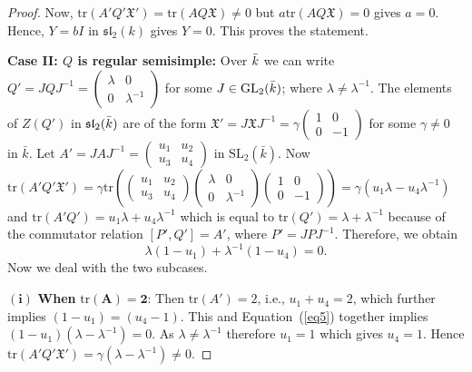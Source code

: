 \documentclass[10pt,twoside]{amsart}
\newcommand{\GL}{\mathrm{GL}}
\newcommand{\SL}{\mathrm{SL}}
\newcommand{\tr}{\mathrm{tr}}
\theoremstyle{definition}
\theoremstyle{definition}
\begin{document}
\begin{proof}
Now, $\tr(A'Q'\mathfrak{X}') = \tr(AQ\mathfrak{X})\neq 0$ but $a\tr(AQ\mathfrak{X})=0$ gives $a=0$. Hence, $Y=bI$ in $\mathfrak {sl}_2(k)$ gives $Y=0$. This proves the statement.

\noindent \textbf{Case II: $Q$ is regular semisimple:} Over $\Bar{k}$ we can write $Q'=JQJ^{-1}=\left(\begin{array}{cc}   \lambda  & 0 \\ 0 & \lambda^{-1} \end{array}\right)$ for some $J\in \GL_2(\Bar{k})$; where $\lambda\neq \lambda^{-1}$. The elements of $Z(Q')$ in $\mathfrak{sl}_2(\Bar{k})$ are of the form $\mathfrak{X}' = J\mathfrak{X}J^{-1} = \gamma\left(\begin{array}{cc} 1  & 0 \\ 0 & -1 \end{array}\right)$ for some $\gamma\neq 0$ in $\bar k$. Let $A' = JAJ^{-1} = \left(\begin{array}{cc} u_1 & u_2 \\    u_3 & u_4 \end{array}\right)$ in $\SL_2(\bar k)$.  Now $\tr(A'Q'\mathfrak{X}') = \gamma\tr (\left(\begin{array}{cc}
u_1 & u_2 \\ u_3 & u_4 \end{array}\right)\left(\begin{array}{cc} \lambda & 0 \\ 0 & \lambda^{-1} \end{array}\right) \left(\begin{array}{cc} 1 & 0 \\ 0 & -1   \end{array}\right)) = \gamma(u_1\lambda-u_4\lambda^{-1})$ and $\tr(A'Q') = u_1 \lambda + u_4\lambda^{-1}$ which is equal to $\tr(Q') = \lambda + \lambda^{-1}$ because of the commutator relation $[P', Q'] = A'$, where $P'=JPJ^{-1}$. Therefore, we obtain 
\begin{equation}\label{eq5}
\lambda(1 - u_1)+ \lambda^{-1}(1-u_4)=0. 
\end{equation} 
Now we deal with the two subcases.

\noindent $\mathbf{(i)}$ \textbf{When} $\mathbf {\tr(A)=2}$: Then $\tr(A')=2$, i.e., $u_1+ u_4 = 2$, which further implies $(1- u_1) = (u_4 -1)$. This and Equation~(\ref{eq5}) together implies $(1-u_1)(\lambda-\lambda^{-1})=0$. As $\lambda\neq \lambda^{-1}$ therefore $u_1=1$ which gives $u_4=1$. Hence $\tr(A'Q'\mathfrak{X}')=\gamma(\lambda-\lambda^{-1})\neq 0$. 


\end{proof}
\end{document}
